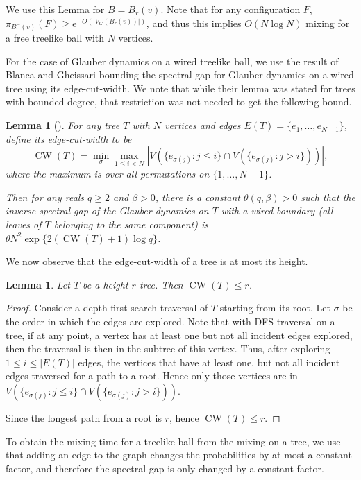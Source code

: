 \documentclass[11pt]{article}
\theoremstyle{plain}
\newtheorem{lemma}[theorem]{Lemma}
\newcommand{\emm}{\mathrm{e}}
\newcommand{\1}{\mathbb{1}}
\DeclareMathOperator{\CW}{CW}
\begin{document}
We use this Lemma for \(B = B_r(v)\). Note that for any configuration \(F\), \(\pi_{B_r^-(v)}(F)\geq \emm^{-O(|V_G(B_r(v))|)}\), and thus this implies \(O(N\log N)\) mixing for a free treelike ball with \(N\) vertices.

For the case of Glauber dynamics on a wired treelike ball, we use the result of Blanca and Gheissari \cite{BlaGhe} bounding the spectral gap for Glauber dynamics on a wired tree using its edge-cut-width. We note that while their lemma was stated for trees with bounded degree, that restriction was not needed to get the following bound.

\begin{lemma}[{\cite[Lemma 5.10]{BlaGhe}}]
    For any tree \(T\) with \(N\) vertices and edges \(E(T) = \{e_1,\dots,e_{N-1}\}\), define its \emph{edge-cut-width} to be
    \[
    \CW(T) = \min_{\sigma}\max_{1\leq i < N} |V(\{e_{\sigma(j)} : j\leq i\}\cap V(\{e_{\sigma(j)} : j > i\}))|,
    \]
    where the maximum is over all permutations on \(\{1,\dots,N-1\}\).

    Then for any reals \(q\geq 2\) and \(\beta > 0\), there is a constant \(\theta(q,\beta) > 0\) such that the inverse spectral gap of the Glauber dynamics on \(T\) with a \emph{wired boundary} (all leaves of \(T\) belonging to the same component) is \(\theta N^2 \exp\{2(\CW(T)+1)\log q\}\).
\end{lemma}

We now observe that the edge-cut-width of a tree is at most its height.

\begin{lemma}
    Let \(T\) be a height-\(r\) tree. Then 
    \(\CW(T)\leq r\).
\end{lemma}
\begin{proof}
    Consider a depth first search traversal of \(T\) starting from its root. Let \(\sigma\) be the order in which the edges are explored. Note that with DFS traversal on a tree, if at any point, a vertex has at least one but not all incident edges explored, then the traversal is then in the subtree of this vertex. Thus, after exploring \(1\leq i\leq |E(T)|\) edges, the vertices that have at least one, but not all incident edges traversed for a path to a root. Hence only those vertices are in \(V(\{e_{\sigma(j)} : j\leq i\}\cap V(\{e_{\sigma(j)} : j > i\}))\).

    Since the longest path from a root is \(r\), hence \(\CW(T)\leq r\).
\end{proof}

To obtain the mixing time for a treelike ball from the mixing on a tree, we use that adding an edge to the graph changes the probabilities by at most a constant factor, and therefore the spectral gap is only changed by a constant factor.
\end{document}
